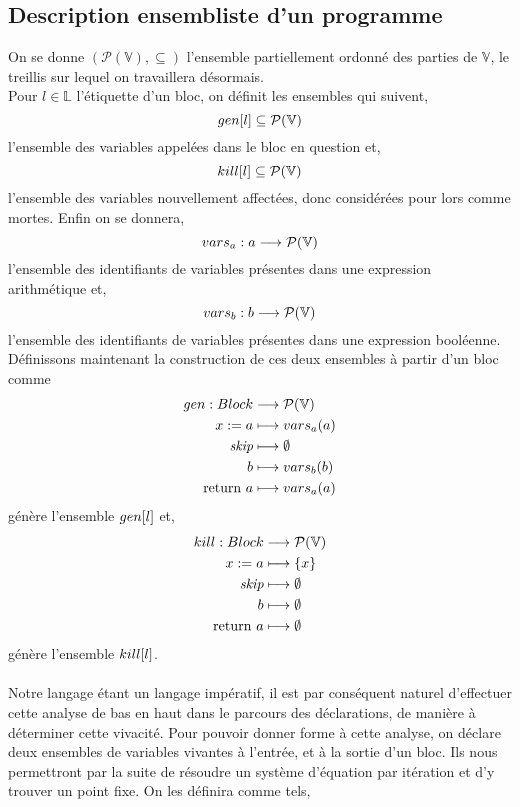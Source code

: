 \documentclass[a4paper, 10pt]{article}
\begin{document}
\subsection{Description ensembliste d'un programme}
On se donne $(\mathcal{P}(\mathbb{V}), \subseteq)$ l'ensemble partiellement ordonné des parties de $\mathbb{V}$, 
le treillis sur lequel on travaillera désormais.
\\
Pour $l \in \mathbb{L}$ l'étiquette d'un bloc, on définit les ensembles qui suivent,
\[gen[l] \subseteq \mathcal{P}(\mathbb{V})\]
l'ensemble des variables appelées dans le bloc en question et,
\[kill[l] \subseteq \mathcal{P}(\mathbb{V})\]
l'ensemble des variables nouvellement affectées, donc considérées pour lors comme mortes. Enfin on se donnera,
\[vars_a : a \longrightarrow \mathcal{P}(\mathbb{V})\]
l'ensemble des identifiants de variables présentes dans une expression arithmétique et,
\[vars_b : b \longrightarrow \mathcal{P}(\mathbb{V})\]
l'ensemble des identifiants de variables présentes dans une expression booléenne.
\\
Définissons maintenant la construction de ces deux ensembles à partir d'un bloc comme
\begin{align*}
	gen : Block &\longrightarrow \mathcal{P}(\mathbb{V})\\
	{x}\space:=\space{a} &\longmapsto vars_a(a)\\
	\textit{skip} &\longmapsto \emptyset\\
	b &\longmapsto vars_b(b)\\
	\text{return }{a} &\longmapsto vars_a(a)
\end{align*}
génère l'ensemble $gen[l]$ et,
\begin{align*}
	kill : Block &\longrightarrow \mathcal{P}(\mathbb{V})\\
	{x}\space:=\space{a} &\longmapsto \{x\}\\
	\textit{skip} &\longmapsto \emptyset\\
	b &\longmapsto \emptyset\\
	\text{return }{a} &\longmapsto \emptyset
\end{align*}
génère l'ensemble $kill[l]$.
\\
\\
Notre langage étant un langage impératif, il est par conséquent naturel d'effectuer cette analyse de bas en haut dans le parcours des déclarations,
de manière à déterminer cette vivacité. Pour pouvoir donner forme à cette analyse, on déclare deux ensembles de variables vivantes à l'entrée, et à la
sortie d'un bloc. Ils nous permettront par la suite de résoudre un système d'équation par itération et d'y trouver un point fixe. 
On les définira comme tels, 
\end{document}
